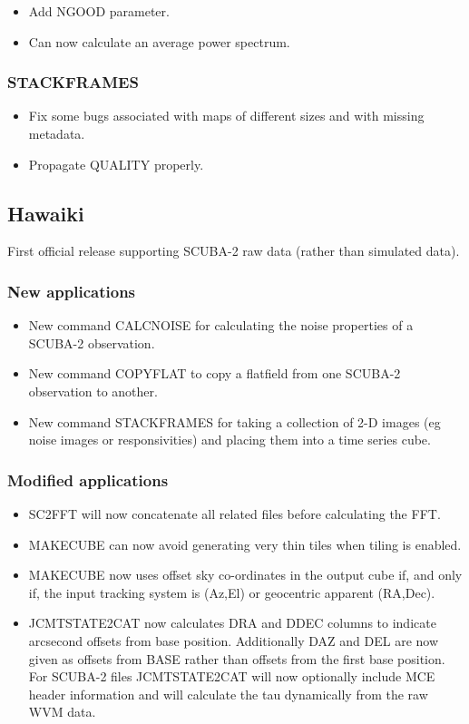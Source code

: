 \documentclass[oneside,11pt]{starlink}
\begin{document}
\begin{itemize}
\item Add NGOOD parameter.
\item Can now calculate an average power spectrum.
\end{itemize}

\subsubsection{STACKFRAMES}

\begin{itemize}
\item Fix some bugs associated with maps of different sizes and with
  missing metadata.
\item Propagate QUALITY properly.
\end{itemize}

\subsection{Hawaiki}

First official release supporting SCUBA-2 raw data (rather than simulated data).

\subsubsection*{New applications}
\begin{itemize}
\item New command CALCNOISE for calculating the noise properties of a SCUBA-2 observation.
\item New command COPYFLAT to copy a flatfield from one SCUBA-2 observation to another.
\item New command STACKFRAMES for taking a collection of 2-D images
  (eg noise images or responsivities) and placing them into a time
  series cube.
\end{itemize}

\subsubsection*{Modified applications}
\begin{itemize}
\item SC2FFT will now concatenate all related files before calculating the FFT.
\item MAKECUBE can now avoid generating very thin tiles when tiling is enabled.
\item MAKECUBE now uses offset sky co-ordinates in the output cube if,
  and only if, the input tracking system is (Az,El) or geocentric
  apparent (RA,Dec).
\item JCMTSTATE2CAT now calculates DRA and DDEC columns to indicate
  arcsecond offsets from base position. Additionally DAZ and DEL are
  now given as offsets from BASE rather than offsets from the first
  base position. For SCUBA-2 files JCMTSTATE2CAT will now optionally include
  MCE header information and will calculate the tau dynamically from the
  raw WVM data.
\end{itemize}
\end{document}
